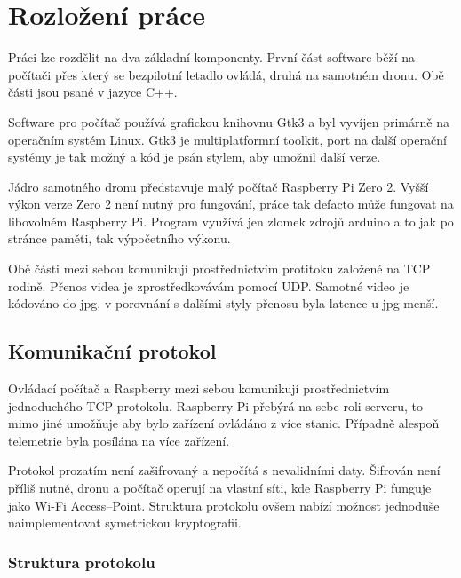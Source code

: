 \documentclass[a4paper,oneside,12pt]{report}
\begin{document}


\tableofcontents


\newpage



\setcounter{page}{1}

\chapter{Rozložení práce}

Práci lze rozdělit na dva základní komponenty.
První část software běží na počítači přes který se bezpilotní letadlo ovládá, druhá na samotném dronu.
Obě části jsou psané v jazyce C++.

Software pro počítač používá grafickou knihovnu Gtk3 a byl vyvíjen primárně na operačním systém Linux.
Gtk3 je multiplatformní toolkit, port na další operační systémy je tak možný a kód je psán stylem, aby umožnil další verze.

Jádro samotného dronu představuje malý počítač Raspberry Pi Zero 2.
Vyšší výkon verze Zero 2 není nutný pro fungování, práce tak defacto může fungovat na libovolném Raspberry Pi.
Program využívá jen zlomek zdrojů arduino a to jak po stránce paměti, tak výpočetního výkonu.

Obě části mezi sebou komunikují prostřednictvím protitoku založené na TCP rodině.
Přenos videa je zprostředkovávám pomocí UDP.
Samotné video je kódováno do jpg, v porovnání s dalšími styly přenosu byla latence u jpg menší.

\section{Komunikační protokol}

Ovládací počítač a Raspberry mezi sebou komunikují prostřednictvím jednoduchého TCP protokolu.
Raspberry Pi přebýrá na sebe roli serveru, to mimo jiné umožňuje aby bylo zařízení ovládáno z více stanic.
Případně alespoň telemetrie byla posílána na více zařízení.

Protokol prozatím není zašifrovaný a nepočítá s nevalidními daty.
Šifrován není příliš nutné, dronu a počítač operují na vlastní síti, kde Raspberry Pi funguje jako Wi-Fi Access--Point.
Struktura protokolu ovšem nabízí možnost jednoduše naimplementovat symetrickou kryptografii.

\subsection{Struktura protokolu}
\end{document}
